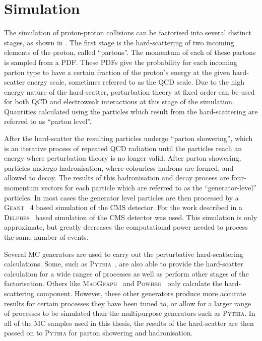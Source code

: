 \section{Simulation}
\label{sec:sim}
The simulation of \LHC proton-proton collisions can be factorised into several distinct stages, as shown in . The first stage is the hard-scattering of two incoming elements of the proton, called ``partons''. The momentum of each of these partons is sampled from a \ac{PDF}. These \ac{PDF}s give the probability for each incoming parton type to have a certain fraction of the proton's energy at the given hard-scatter energy scale, sometimes referred to as the \ac{QCD} scale. Due to the high energy nature of the hard-scatter, perturbation theory at fixed order can be used for both \ac{QCD} and electroweak interactions at this stage of the simulation. Quantities calculated using the particles which result from the hard-scattering are referred to as ``parton level''.

After the hard-scatter the resulting particles undergo ``parton showering'', which is an iterative process of repeated \ac{QCD} radiation until the particles reach an energy where perturbation theory is no longer valid. After parton showering, particles undergo hadronisation, where colourless hadrons are formed, and allowed to decay. The results of this hadronisation and decay process are four-momentum vectors for each particle which are referred to as the ``generator-level'' particles. In most cases the generator level particles are then processed by a \textsc{Geant}~\cite{Agostinelli2003250} 4 based simulation of the CMS detector. For the work described in  a \textsc{Delphes}~\cite{Favereau2014} based simulation of the CMS detector was used. This simulation is only approximate, but greatly decreases the computational power needed to process the same number of events.

Several \ac{MC} generators are used to carry out the perturbative hard-scattering calculations. Some, such as \textsc{Pythia}~\cite{Sjöstrand2008852}, are also able to provide the hard-scatter calculation for a wide ranges of processes as well as perform other stages of the factorisation. Others like \textsc{MadGraph}~\cite{Alwall2014} and \textsc{Powheg}~\cite{Nason:2004rx,Frixione:2007vw,Alioli:2010xd} only calculate the hard-scattering component. However, these other generators produce more accurate results for certain processes they have been tuned to, or allow for a larger range of processes to be simulated than the multipurpose generators such as \textsc{Pythia}. In all of the \ac{MC} samples used in this thesis, the results of the hard-scatter are then passed on to \textsc{Pythia} for parton showering and hadronisation.

